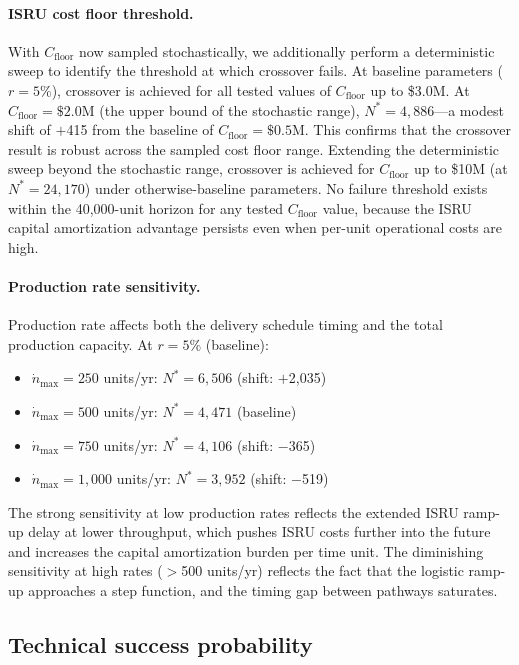 \documentclass[preprint,12pt]{elsarticle}
\begin{document}
\paragraph{ISRU cost floor threshold.} With $C_{\mathrm{floor}}$ now sampled stochastically, we additionally perform a deterministic sweep to identify the threshold at which crossover fails. At baseline parameters ($r = 5\%$), crossover is achieved for all tested values of $C_{\mathrm{floor}}$ up to \$3.0M. At $C_{\mathrm{floor}} = \$2.0$M (the upper bound of the stochastic range), $N^* = 4{,}886$---a modest shift of $+$415 from the baseline of $C_{\mathrm{floor}} = \$0.5$M. This confirms that the crossover result is robust across the sampled cost floor range. Extending the deterministic sweep beyond the stochastic range, crossover is achieved for $C_{\mathrm{floor}}$ up to \$10M (at $N^* = 24{,}170$) under otherwise-baseline parameters. No failure threshold exists within the 40,000-unit horizon for any tested $C_{\mathrm{floor}}$ value, because the ISRU capital amortization advantage persists even when per-unit operational costs are high.

\paragraph{Production rate sensitivity.} Production rate affects both the delivery schedule timing and the total production capacity. At $r = 5\%$ (baseline):

\begin{itemize}
\item $\dot{n}_{\max} = 250$ units/yr: $N^* = 6{,}506$ (shift: $+$2{,}035)
\item $\dot{n}_{\max} = 500$ units/yr: $N^* = 4{,}471$ (baseline)
\item $\dot{n}_{\max} = 750$ units/yr: $N^* = 4{,}106$ (shift: $-$365)
\item $\dot{n}_{\max} = 1{,}000$ units/yr: $N^* = 3{,}952$ (shift: $-$519)
\end{itemize}

The strong sensitivity at low production rates reflects the extended ISRU ramp-up delay at lower throughput, which pushes ISRU costs further into the future and increases the capital amortization burden per time unit. The diminishing sensitivity at high rates ($>$500 units/yr) reflects the fact that the logistic ramp-up approaches a step function, and the timing gap between pathways saturates.

\subsection{Technical success probability}
\label{sec:success_probability}
\end{document}
